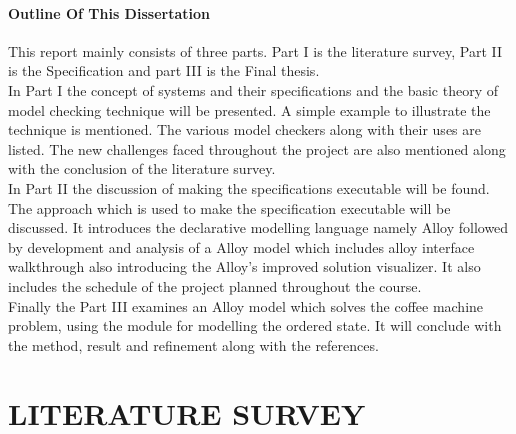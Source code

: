 \documentclass[a4paper,12pt]{extarticle}
\begin{document}
\subsection{Outline Of This Dissertation}
\label{Outline dissert}
This report mainly consists of three parts. Part I is the literature survey, Part II is the Specification and part III is the Final thesis.\\
In Part I the concept of systems and their specifications and the basic theory of model checking technique will be presented. A simple example to illustrate the technique is mentioned. The various model checkers along with their uses are listed. The new challenges faced throughout the project are also mentioned along with the conclusion of the literature survey.\\
In Part II the discussion of making the specifications executable will be found. The approach which is used to make the specification executable will be discussed. It introduces the declarative modelling language namely Alloy followed by development and analysis of a Alloy model which includes alloy interface walkthrough also introducing the Alloy's improved solution visualizer. It also includes the schedule of the project planned throughout the course.\\
Finally the Part III examines an Alloy model which solves the coffee machine problem, using the module for modelling the ordered state. It will conclude with the method, result and refinement along with the references.
\pagebreak
\part{LITERATURE SURVEY}
\pagebreak
\end{document}
